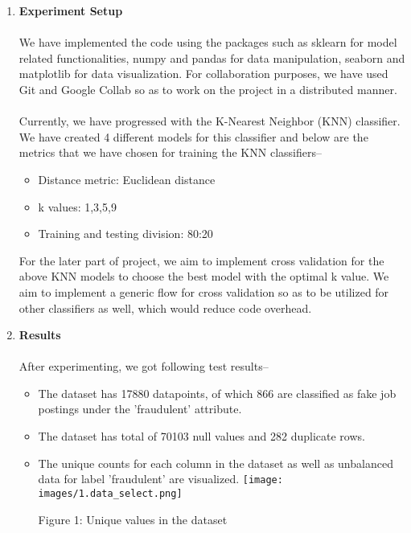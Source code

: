 \documentclass{article}
\begin{document}
\begin{enumerate}[wide, labelwidth=!, labelindent=0pt]
        \item \textbf{Experiment Setup}\\\\
        We have implemented the code using the packages such as sklearn for model related functionalities, numpy and pandas for data manipulation, seaborn and matplotlib for data visualization. For collaboration purposes, we have used Git and Google Collab so as to work on the project in a distributed manner.\\\\
        Currently, we have progressed with the K-Nearest Neighbor (KNN) classifier. We have created 4 different models for this classifier and below are the metrics that we have chosen for training the KNN classifiers--
        \begin{itemize}
            \item Distance metric: Euclidean distance
            \item k values: 1,3,5,9
            \item Training and testing division: 80:20
        \end{itemize}
        For the later part of project, we aim to implement cross validation for the above KNN models to choose the best model with the optimal k value. We aim to implement a generic flow for cross validation so as to be utilized for other classifiers as well, which would reduce code overhead.

        \item \textbf{Results}\\\\
        After experimenting, we got following test results--
        \begin{itemize}
            \item The dataset has 17880 datapoints, of which 866 are classified as fake job postings under the 'fraudulent' attribute.
            \item The dataset has total of 70103 null values and 282 duplicate rows.
            \item The unique counts for each column in the dataset as well as unbalanced data for label 'fraudulent' are visualized.
            \hspace*{-2cm}
            \texttt{[image: images/1.data\_select.png]}
            \begin{center}
            \caption{Figure 1: Unique values in the dataset}
            \end{center}\\\\


\end{itemize}
\end{enumerate}
\end{document}
